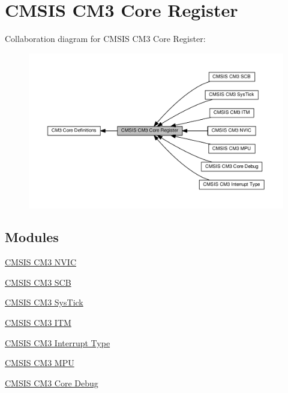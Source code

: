 \hypertarget{group__CMSIS__CM3__core__register}{}\section{C\+M\+S\+IS C\+M3 Core Register}
\label{group__CMSIS__CM3__core__register}
Collaboration diagram for C\+M\+S\+IS C\+M3 Core Register\+:\nopagebreak
\begin{figure}[H]
\begin{center}
\leavevmode
\includegraphics[width=350pt]{d2/d96/group__CMSIS__CM3__core__register}
\end{center}
\end{figure}
\subsection*{Modules}
\begin{DoxyCompactItemize}
\item 
\hyperlink{group__CMSIS__CM3__NVIC}{C\+M\+S\+I\+S C\+M3 N\+V\+IC}
\item 
\hyperlink{group__CMSIS__CM3__SCB}{C\+M\+S\+I\+S C\+M3 S\+CB}
\item 
\hyperlink{group__CMSIS__CM3__SysTick}{C\+M\+S\+I\+S C\+M3 Sys\+Tick}
\item 
\hyperlink{group__CMSIS__CM3__ITM}{C\+M\+S\+I\+S C\+M3 I\+TM}
\item 
\hyperlink{group__CMSIS__CM3__InterruptType}{C\+M\+S\+I\+S C\+M3 Interrupt Type}
\item 
\hyperlink{group__CMSIS__CM3__MPU}{C\+M\+S\+I\+S C\+M3 M\+PU}
\item 
\hyperlink{group__CMSIS__CM3__CoreDebug}{C\+M\+S\+I\+S C\+M3 Core Debug}
\end{DoxyCompactItemize}
